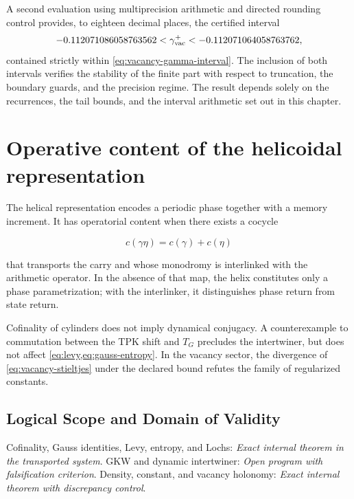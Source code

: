 A second evaluation using multiprecision arithmetic and directed
rounding control provides, to eighteen decimal places, the certified interval
\[
-0.112071086058763562
<\gamma_{\rm vac}^{+}
<-0.112071064058763762,
\]
contained strictly within \cref{eq:vacancy-gamma-interval}. The inclusion of
both intervals verifies the stability of the finite part with respect to
truncation, the boundary guards, and the precision regime. The
result depends solely on the recurrences, the tail bounds, and the
interval arithmetic set out in this chapter.

\section{Operative content of the helicoidal representation}

The helical representation encodes a periodic phase together with a
memory increment. It has operatorial content when there exists a cocycle

\[
c(\gamma\eta)=c(\gamma)+c(\eta)
\]

that transports the carry and whose monodromy is interlinked with the
arithmetic operator. In the absence of that map, the helix constitutes only a
phase parametrization; with the interlinker, it distinguishes phase return
from state return.

\begin{remark}
Cofinality of cylinders does not imply dynamical
conjugacy. A counterexample to commutation between
the TPK shift and \(T_G\) precludes the intertwiner, but does not affect
\cref{eq:levy,eq:gauss-entropy}. In the vacancy sector, the divergence of
\cref{eq:vacancy-stieltjes} under the declared bound refutes the family of
regularized constants.
\end{remark}

\subsection*{Logical Scope and Domain of Validity}
Cofinality, Gauss identities, Levy, entropy, and Lochs: \emph{Exact internal theorem in the transported system}. GKW and dynamic intertwiner: \emph{Open program with falsification criterion}. Density, constant, and vacancy holonomy: \emph{Exact internal theorem with discrepancy control}.
